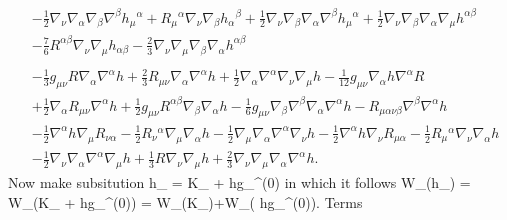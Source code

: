 \documentclass[10pt,letterpaper]{article}
\begin{document}
\begin{align}
& -  \tfrac{1}{2} \nabla_{\nu}\nabla_{\alpha}\nabla_{\beta}\nabla^{\beta}h_{\mu}{}^{\alpha}
 + R_{\mu}{}^{\alpha} \nabla_{\nu}\nabla_{\beta}h_{\alpha}{}^{\beta}
 + \tfrac{1}{2} \nabla_{\nu}\nabla_{\beta}\nabla_{\alpha}\nabla^{\beta}h_{\mu}{}^{\alpha}
 + \tfrac{1}{2} \nabla_{\nu}\nabla_{\beta}\nabla_{\alpha}\nabla_{\mu}h^{\alpha \beta}\nonumber\\
& -  \tfrac{7}{6} R^{\alpha \beta} \nabla_{\nu}\nabla_{\mu}h_{\alpha \beta}
 -  \tfrac{2}{3} \nabla_{\nu}\nabla_{\mu}\nabla_{\beta}\nabla_{\alpha}h^{\alpha \beta}\nonumber \\
\\
&- \tfrac{1}{3} g_{\mu \nu} R \nabla_{\alpha}\nabla^{\alpha}h
 + \tfrac{2}{3} R_{\mu \nu} \nabla_{\alpha}\nabla^{\alpha}h
 + \tfrac{1}{2} \nabla_{\alpha}\nabla^{\alpha}\nabla_{\nu}\nabla_{\mu}h
 -  \tfrac{1}{12} g_{\mu \nu} \nabla_{\alpha}h \nabla^{\alpha}R\nonumber\\
& + \tfrac{1}{2} \nabla_{\alpha}R_{\mu \nu} \nabla^{\alpha}h
 + \tfrac{1}{2} g_{\mu \nu} R^{\alpha \beta} \nabla_{\beta}\nabla_{\alpha}h
 -  \tfrac{1}{6} g_{\mu \nu} \nabla_{\beta}\nabla^{\beta}\nabla_{\alpha}\nabla^{\alpha}h
 -  R_{\mu \alpha \nu \beta} \nabla^{\beta}\nabla^{\alpha}h\nonumber\\
& -  \tfrac{1}{2} \nabla^{\alpha}h \nabla_{\mu}R_{\nu \alpha}
 -  \tfrac{1}{2} R_{\nu}{}^{\alpha} \nabla_{\mu}\nabla_{\alpha}h
 -  \tfrac{1}{2} \nabla_{\mu}\nabla_{\alpha}\nabla^{\alpha}\nabla_{\nu}h
 -  \tfrac{1}{2} \nabla^{\alpha}h \nabla_{\nu}R_{\mu \alpha}
 -  \tfrac{1}{2} R_{\mu}{}^{\alpha} \nabla_{\nu}\nabla_{\alpha}h\nonumber\\
& -  \tfrac{1}{2} \nabla_{\nu}\nabla_{\alpha}\nabla^{\alpha}\nabla_{\mu}h
 + \tfrac{1}{3} R \nabla_{\nu}\nabla_{\mu}h
 + \tfrac{2}{3} \nabla_{\nu}\nabla_{\mu}\nabla_{\alpha}\nabla^{\alpha}h.
\end{align}
Now make subsitution
\be
	h_{\mu\nu} = K_{\mu\nu} +  hg_{\mu\nu}^{(0)}
\ee
in which it follows
\be
	\delta W_{\mu\nu}(h_{\mu\nu}) = \delta W_{\mu\nu}(K_{\mu\nu} +  hg_{\mu\nu}^{(0)}) = \delta W_{\mu\nu}(K_{\mu\nu})+\delta W_{\mu\nu}( hg_{\mu\nu}^{(0)}).
 Terms
\end{document}
